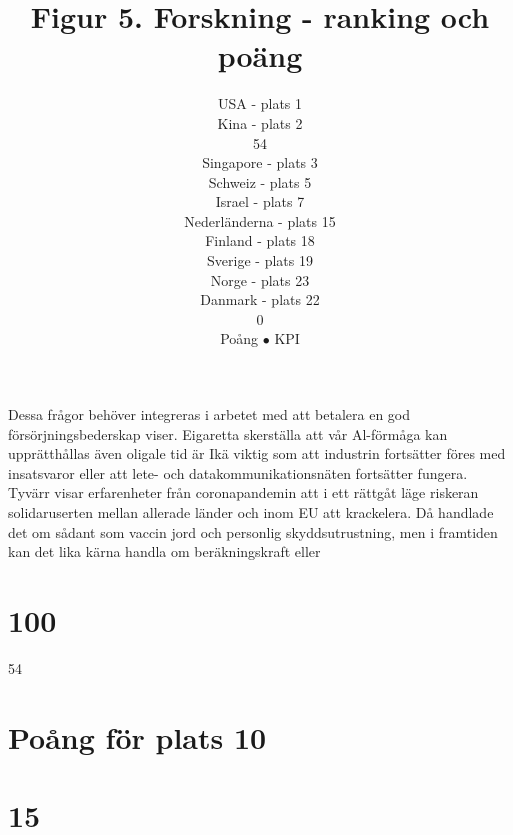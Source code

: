 {{{{{Dessa frågor behöver integreras i arbetet med att betalera en god försörjningsbederskap viser. Eigaretta skerställa att vår Al-förmåga kan upprätthållas även oligale tid är Ikä viktig som att industrin fortsätter föres med insatsvaror eller att lete- och datakommunikationsnäten fortsätter fungera. Tyvärr visar erfarenheter från coronapandemin att i ett rättgåt läge riskeran solidaruserten mellan allerade länder och inom EU att krackelera. Då handlade det om sådant som vaccin jord och personlig skyddsutrustning, men i framtiden kan det lika kärna handla om beräkningskraft eller

\title{
Figur 5. Forskning - ranking och poäng
}
\author{
USA - plats 1 \\ Kina - plats 2 \\ 54 \\ Singapore - plats 3 \\ Schweiz - plats 5 \\ Israel - plats 7 \\ Nederländerna - plats 15 \\ Finland - plats 18 \\ Sverige - plats 19 \\ Norge - plats 23 \\ Danmark - plats 22 \\ 0 \\ Poång \(\bullet\) KPI
}
\section*{100}
54
\section*{Poång för plats 10}
\section*{15}
}}}}}
